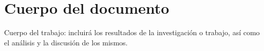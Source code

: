 
\chapter{Cuerpo del documento} 
\label{ch:body}

Cuerpo del trabajo: incluirá los resultados de la investigación o trabajo, así como el análisis y la discusión de los mismos.\showthe\font
